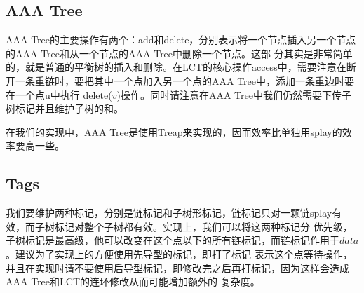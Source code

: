 ﻿\documentclass{article}
\begin{document}
	\subsection{AAA Tree}
	\indent AAA Tree的主要操作有两个：add和delete，分别表示将一个节点插入另一个节点的AAA Tree和从一个节点的AAA Tree中删除一个节点。这部
	分其实是非常简单的，就是普通的平衡树的插入和删除。在LCT的核心操作access中，需要注意在断开一条重链时，要把其中一个点加入另一个点的AAA Tree中，添加一条重边时要在一个点u中执行
	delete($v$)操作。同时请注意在AAA Tree中我们仍然需要下传子树标记并且维护子树的和。\par
	\indent 在我们的实现中，AAA Tree是使用Treap来实现的，因而效率比单独用splay的效率要高一些。
	\subsection{Tags}
	我们要维护两种标记，分别是链标记和子树形标记，链标记只对一颗链splay有效，而子树标记对整个子树都有效。实现上，我们可以将这两种标记分
	优先级，子树标记是最高级，他可以改变在这个点以下的所有链标记，而链标记作用于$data$。建议为了实现上的方便使用先导型的标记，即打了标记
	表示这个点等待操作，并且在实现时请不要使用后导型标记，即修改完之后再打标记，因为这样会造成AAA Tree和LCT的连环修改从而可能增加额外的
	复杂度。
\end{document}
